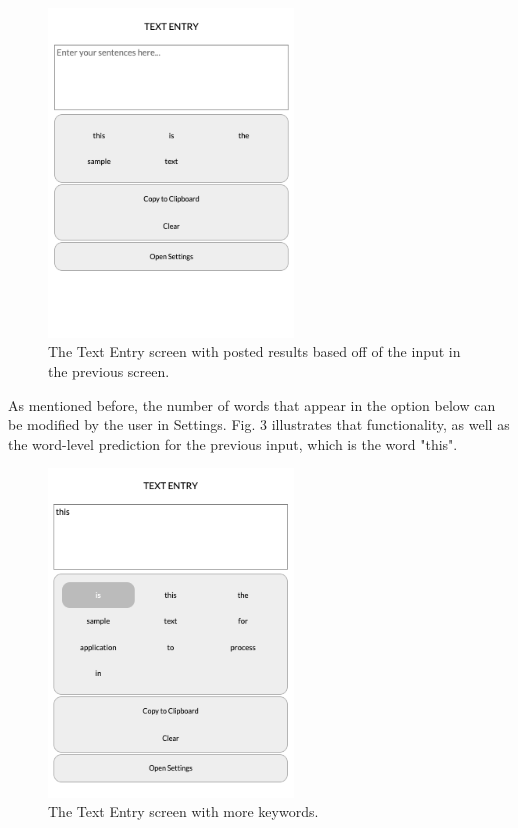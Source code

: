 \documentclass[journal]{./IEEE/IEEEtran}
\begin{document}
\begin{figure}[!ht]
\begin{center}

\includegraphics[width=65mm]{images/initial-text-entry.png}
\caption{The Text Entry screen with posted results based off of the input in the previous screen.}

\end{center}
\end{figure}

As mentioned before, the number of words that appear in the option below can be modified by the user in Settings. Fig. 3 illustrates that functionality, as well as the word-level prediction for the previous input, which is the word "this".

\begin{figure}[!ht]
\begin{center}

\includegraphics[width=65mm]{images/word-level-prediction.png}
\caption{The Text Entry screen with more keywords.}

\end{center}
\end{figure}
\end{document}
